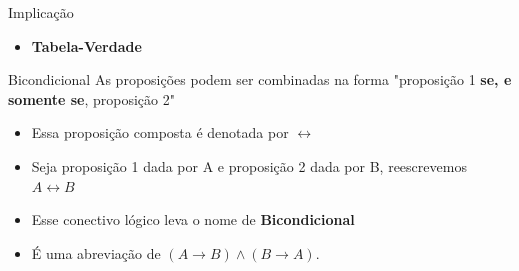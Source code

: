 \documentclass[aspectratio=169]{beamer}
\begin{document}
\begin{frame}{Implicação}
    \begin{itemize}
        \item \textbf{Tabela-Verdade}
    \end{itemize}

    \vspace{4mm}

    \begin{table}[hb]
    \end{table}
\end{frame}

\begin{frame}{Bicondicional}
    As proposições podem ser combinadas na forma "proposição 1 \textbf{se, e somente se},
    proposição 2"
    \begin{itemize}
        \item Essa proposição composta é denotada por $\leftrightarrow$
        \item Seja proposição 1 dada por A e proposição 2 dada por B, reescrevemos $A \leftrightarrow B$
        \item Esse conectivo lógico leva o nome de \textbf{Bicondicional}
        \item É uma abreviação de $(A \rightarrow B) \wedge (B \rightarrow A)$.
    \end{itemize}
\end{frame}
\end{document}
